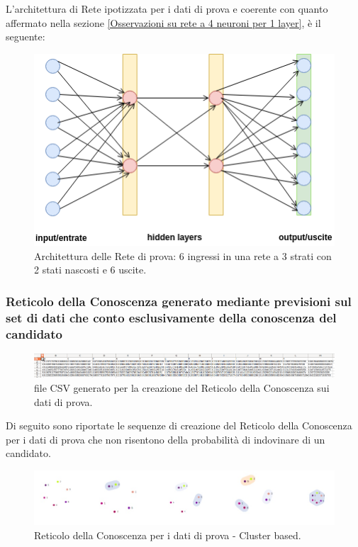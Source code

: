 L'architettura di Rete ipotizzata per i dati di prova e coerente con quanto affermato nella sezione \ref{Osservazioni su rete a 4 neuroni per 1 layer}, è il seguente:
\noindent
\begin{figure}[H]
\centering
	\includegraphics[width=0.60\linewidth]{./image/architettura-rete-prova.png}
	\caption{Architettura delle Rete di prova: 6 ingressi in una rete a 3 strati con 2 stati nascosti e 6 uscite.}
	\label{Archittettura delle Rete di prova: 6 ingressi in una rete a 3 strati con 2 stati nascosti e 6 uscite.}
\end{figure}
\noindent



\subsubsection{Reticolo della Conoscenza generato mediante previsioni sul set di dati che conto esclusivamente della conoscenza del candidato}
\label{Reticolo della Conoscenza generato mediante previsioni sul set di dati che tiene conto esclusivamente della conoscenza del candidato}

\noindent
\begin{figure}[H]
\centering
	\includegraphics[width=1\linewidth]{./image/fileCSV_rete-prova.png}
	\caption{file CSV generato per la creazione del Reticolo della Conoscenza sui dati di prova.}
	\label{file CSV generato per la creazione del Reticolo della Conoscenza sui dati di prova.}
\end{figure}
\noindent
Di seguito sono riportate le sequenze di creazione del Reticolo della Conoscenza per i dati di prova che non risentono della probabilit\`a di indovinare di un candidato.
\noindent

\begin{figure}[H]
\centering
	\includegraphics[width=1.20\linewidth]{./image/collage_reticolo-general-cluster.png}
	\caption{Reticolo della Conoscenza per i dati di prova - Cluster based.}
	\label{Reticolo della Conoscenza per i dati di prova - Cluster based.}
\end{figure}
\noindent

